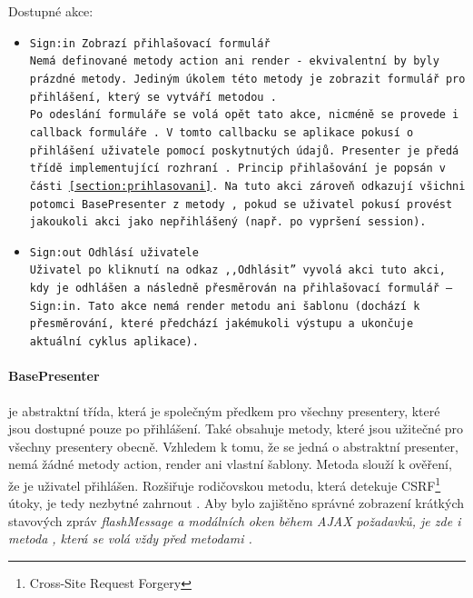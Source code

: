 Dostupné akce:
\begin{itemize}
	\item \tt{Sign:in} Zobrazí přihlašovací formulář\\
Nemá definované metody action ani render - ekvivalentní by byly prázdné metody. Jediným úkolem této metody je zobrazit formulář pro přihlášení, který se vytváří metodou .\\
Po~odeslání formuláře se volá opět tato akce, nicméně se provede i callback formuláře . V tomto callbacku se aplikace pokusí o přihlášení uživatele pomocí poskytnutých údajů. Presenter je předá třídě implementující rozhraní . Princip přihlašování je popsán v části \ref{section:prihlasovani}. Na tuto akci zároveň odkazují všichni potomci BasePresenter z metody , pokud se uživatel pokusí provést jakoukoli akci jako nepřihlášený (např. po~vypršení session).
	\item \tt{Sign:out} Odhlásí uživatele\\
Uživatel po kliknutí na odkaz ,,Odhlásit'' vyvolá akci tuto akci, kdy je odhlášen a následně přesměrován na přihlašovací formulář -- \tt{Sign:in}. Tato akce nemá render metodu ani šablonu (dochází k přesměrování, které předchází jakémukoli výstupu a ukončuje aktuální cyklus aplikace).
\end{itemize}


\paragraph{BasePresenter} je abstraktní třída, která je společným předkem pro všechny presentery, které jsou dostupné pouze po přihlášení. Také obsahuje metody, které jsou užitečné pro všechny presentery obecně. Vzhledem k tomu, že se jedná o abstraktní presenter, nemá žádné metody action, render ani vlastní šablony. 
Metoda  slouží k ověření, že je uživatel přihlášen. Rozšiřuje rodičovskou metodu, která detekuje CSRF\footnote{Cross-Site Request Forgery} útoky, je tedy nezbytné zahrnout %
. Aby bylo zajištěno správné zobrazení krátkých stavových zpráv \it{flashMessage} a modálních oken během AJAX požadavků, je zde i metoda , která se volá vždy před metodami .


